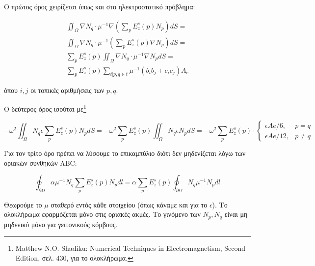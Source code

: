 \documentclass[10pt, letterpaper]{article}
\newcommand{\en}{\selectlanguage{english}}
\newcommand{\gr}{\selectlanguage{greek}}
\begin{document}
Ο πρώτος όρος χειρίζεται όπως και στο ηλεκτροστατικό πρόβλημα:

\begin{equation}
  \begin{align}
    \iint_{\Omega} \nabla N_q \cdot \mu^{-1}  \nabla \left( \sum_p E_z^s(p) N_p \right) dS  = \\
    \iint_{\Omega} \nabla N_q \cdot \mu^{-1}   \left( \sum_p E_z^s(p) \nabla N_p \right) dS  = \\
    \sum_p E_z^s(p) \iint_{\Omega} \nabla N_q \cdot \mu^{-1}   \nabla N_p dS  = \\ 
    \sum_p E_z^s(p) \sum_{t | p,q \in t} \mu^{-1} (b_ib_j + c_ic_j) A_e
  \end{align}
\end{equation}

όπου $i,j$ οι τοπικές αριθμήσεις των $p,q$. 

Ο δεύτερος όρος ισούται με\footnote{\textlatin{Matthew N.O. Shadiku: Numerical Techniques in Electromagnetism, Second Edition}, σελ.  430, για το ολοκλήρωμα.}

\begin{equation}
    - \omega^2 \iint_{\Omega} N_q \epsilon \sum_p E_z^s(p) N_p dS = 
    - \omega^2 \sum_p E_z^s(p) \iint_{\Omega} N_q \epsilon  N_p dS = 
    - \omega^2 \sum_p E_z^s(p) \cdot
    \begin{cases}
      \epsilon Ae / 6, & p = q \\ 
      \epsilon Ae / 12, & p \neq q
    \end{cases}
\end{equation}




Για τον τρίτο όρο πρέπει να λύσουμε το επικαμπύλιο διότι δεν μηδενίζεται λόγω των οριακών συνθηκών \en ABC: \gr 

\begin{equation}
    \oint_{\partial \Omega} \alpha \mu^{-1} N_q \sum_{p} E_z^s(p) N_p dl = \alpha \sum_p E_z^s(p) \oint_{\partial \Omega} N_q \mu^{-1} N_p dl
\end{equation}

Θεωρούμε το $\mu$ σταθερό εντός κάθε στοιχείου (όπως κάναμε και για το $\epsilon$).
Το ολοκλήρωμα εφαρμόζεται μόνο στις οριακές ακμές. Το γινόμενο των $N_p, N_q$ είναι μη μηδενικό μόνο για γειτονικούς κόμβους.
\end{document}
